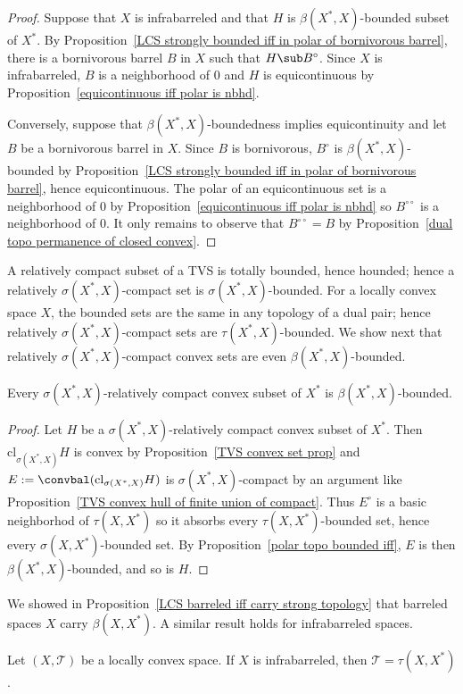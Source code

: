 \begin{proof}
Suppose that $X$ is infrabarreled and that $H$ is $\beta(X^*,X)$-bounded subset of $X^*$. By Proposition~\ref{LCS strongly bounded iff in polar of bornivorous barrel}, there is a bornivorous barrel $B$ in $X$ such that $H\sub B^\circ$. Since $X$ is infrabarreled, $B$ is a neighborhood of $0$ and $H$ is equicontinuous by Proposition~\ref{equicontinuous iff polar is nbhd}.\par
Conversely, suppose that $\beta(X^*,X)$-boundedness implies equicontinuity and let $B$ be a bornivorous barrel in $X$. Since $B$ is bornivorous, $B^\circ$ is $\beta(X^*,X)$-bounded by Proposition~\ref{LCS strongly bounded iff in polar of bornivorous barrel}, hence equicontinuous. The polar of an equicontinuous set is a neighborhood of $0$ by Proposition~\ref{equicontinuous iff polar is nbhd} so $B^{\circ\circ}$ is a neighborhood of $0$. It only remains to observe that $B^{\circ\circ}=B$ by Proposition~\ref{dual topo permanence of closed convex}.
\end{proof}
A relatively compact subset of a TVS is totally bounded, hence hounded; hence a relatively $\sigma(X^*,X)$-compact set is $\sigma(X^*,X)$-bounded. For a locally convex space $X$, the bounded sets are the same in any topology of a dual pair; hence relatively $\sigma(X^*,X)$-compact sets are $\tau(X^*,X)$-bounded. We show next that relatively $\sigma(X^*,X)$-compact convex sets are even $\beta(X^*,X)$-bounded.
\begin{proposition}\label{weak precompact convex is strongly bounded}
Every $\sigma(X^*,X)$-relatively compact convex subset of $X^*$ is $\beta(X^*,X)$-bounded.
\end{proposition}
\begin{proof}
Let $H$ be a $\sigma(X^*,X)$-relatively compact convex subset of $X^*$. Then $\mathrm{cl}_{\sigma(X^*,X)}H$ is convex by Proposition~\ref{TVS convex set prop} and $E:=\convbal(\mathrm{cl}_{\sigma(X^*,X)}H)$ is $\sigma(X^*,X)$-compact by an argument like Proposition~\ref{TVS convex hull of finite union of compact}. Thus $E^\circ$ is a basic neighborhod of $\tau(X,X^*)$ so it absorbs every $\tau(X,X^*)$-bounded set, hence every $\sigma(X,X^*)$-bounded set. By Proposition~\ref{polar topo bounded iff}, $E$ is then $\beta(X^*,X)$-bounded, and so is $H$.
\end{proof}
We showed in Proposition~\ref{LCS barreled iff carry strong topology} that barreled spaces $X$ carry $\beta(X,X^*)$. A similar result holds for infrabarreled spaces.
\begin{proposition}\label{LCS infrabarreled carry tau(X,X^*)}
Let $(X,\mathcal{T})$ be a locally convex space. If $X$ is infrabarreled, then $\mathcal{T}=\tau(X,X^*)$.
\end{proposition}
